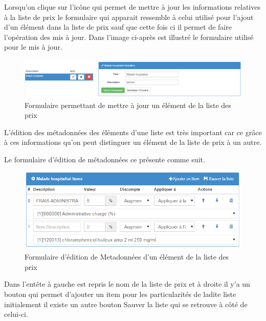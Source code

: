 \documentclass[12pt,a4paper]{report}
\begin{document}
Lorsqu'on clique sur l'icône qui permet de mettre à jour les informations relatives à la liste de prix le formulaire qui apparait ressemble à celui utilisé pour l'ajout d'un élément dans la liste de prix sauf que cette fois ci il permet de faire l'opération des mis à jour.
Dans l'image ci-après est illustré le formulaire utilisé pour le mis à jour.

\begin{figure}[h]
\begin{center}
\includegraphics[width=14cm]{pic/FormUpdateListePrice.png}
\end{center}
\caption{Formulaire permettant de mettre à jour un élément de la liste des prix}
\label{Formulaire permettant de mettre à jour un élément de la liste des prix}
\end{figure}

L'édition des métadonnées des éléments d'une liste est très important car ce grâce à ces informations qu'on peut distinguer un élément de la liste de prix à un autre.

Le formulaire d'édition de métadonnées ce présente comme suit.
\newpage
\begin{figure}[h]
\begin{center}
\includegraphics[width=14cm]{pic/EditionMetaDonneListeP.png}
\end{center}
\caption{Formulaire d'édition de Metadonnées d'un élément de la liste des prix}
\label{Formulaire permettant de mettre à jour un élément de la liste de prix}
\end{figure}

Dans l'entête à gauche est repris le nom de la liste de prix et à droite il y'a un bouton qui permet d'ajouter un item pour les particularités de ladite liste initialement il existe un autre bouton Sauver la liste qui se retrouve à côté de celui-ci.
\end{document}
